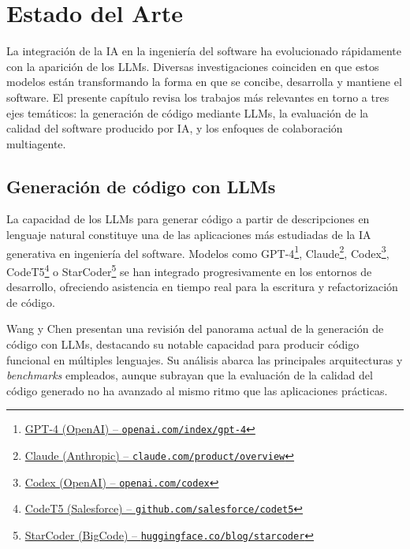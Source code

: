 
\cleardoublepage
\chapter{Estado del Arte} \label{chap:RelatedWork}
La integración de la \ac{IA} en la ingeniería del software ha evolucionado rápidamente con la aparición de los \ac{LLMs}. Diversas investigaciones  \cite{Khade:2025:AIinSD, Qian:2024:ChatDev} 
coinciden en que estos modelos están transformando la forma en que se concibe, desarrolla y mantiene el software. El presente capítulo revisa los trabajos más relevantes en torno a tres ejes temáticos: la generación de código mediante \ac{LLMs}, la evaluación de la calidad del software producido por \ac{IA}, y los enfoques de colaboración multiagente.

\section{Generación de código con LLMs} \label{sec:generacion-codigo}

La capacidad de los \ac{LLMs} para generar código a partir de descripciones en lenguaje natural constituye una de las aplicaciones más estudiadas de la \ac{IA} generativa en ingeniería del software. Modelos como GPT-4\footnote{\href{https://openai.com/index/gpt-4}{GPT-4 (OpenAI) -- \texttt{openai.com/index/gpt-4}}}, Claude\footnote{\href{https://claude.com/product/overview}{Claude (Anthropic) -- \texttt{claude.com/product/overview}}}, Codex\footnote{\href{https://openai.com/codex}{Codex (OpenAI) -- \texttt{openai.com/codex}}}, CodeT5\footnote{\href{https://github.com/salesforce/codet5}{CodeT5 (Salesforce) -- \texttt{github.com/salesforce/codet5}}} o StarCoder\footnote{\href{https://huggingface.co/blog/starcoder}{StarCoder (BigCode) -- \texttt{huggingface.co/blog/starcoder}}} se han integrado progresivamente en los entornos de desarrollo, ofreciendo asistencia en tiempo real para la escritura y refactorización de código.

Wang y Chen \cite{Wang:2023:LLMReview} presentan una revisión del panorama actual de la generación de código con \ac{LLMs}, destacando su notable capacidad para producir código funcional en múltiples lenguajes. Su análisis abarca las principales arquitecturas y \textit{benchmarks} empleados, aunque subrayan que la evaluación de la calidad del código generado no ha avanzado al mismo ritmo que las aplicaciones prácticas.

